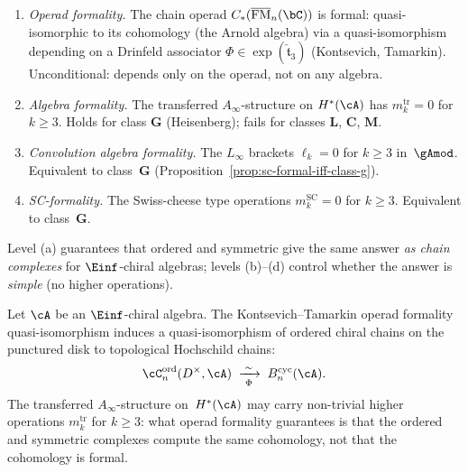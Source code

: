 \begin{definition}
\label{def:e1-formality-hierarchy}
\begin{enumerate}[label=\textup{(\alph*)}]
\item \emph{Operad formality.} The chain operad
 $C_*(\overline{\operatorname{FM}}_n(\bC))$ is formal:
 quasi-isomorphic to its cohomology (the Arnold algebra)
 via a quasi-isomorphism depending on a Drinfeld associator
 $\Phi \in \exp(\hat{\mathfrak{t}}_3)$
 (Kontsevich, Tamarkin). Unconditional: depends only on the
 operad, not on any algebra.
\item \emph{Algebra formality.} The transferred
 $A_\infty$-structure on $H^*(\cA)$ has
 $m_k^{\mathrm{tr}} = 0$ for $k \ge 3$.
 Holds for class $\mathbf{G}$ (Heisenberg); fails for
 classes $\mathbf{L}$, $\mathbf{C}$, $\mathbf{M}$.
\item \emph{Convolution algebra formality.}
 The $L_\infty$ brackets $\ell_k = 0$ for
 $k \ge 3$ in~$\gAmod$. Equivalent to class~$\mathbf{G}$
 (Proposition~\ref{prop:sc-formal-iff-class-g}).
\item \emph{SC-formality.} The Swiss-cheese type
 operations $m_k^{\mathrm{SC}} = 0$ for $k \ge 3$.
 Equivalent to class~$\mathbf{G}$.
\end{enumerate}
Level (a) guarantees that ordered and symmetric give the
same answer \emph{as chain complexes} for $\Einf$-chiral
algebras; levels (b)--(d) control whether the answer is
\emph{simple} (no higher operations).
\end{definition}

\begin{theorem}
\label{thm:e1-formality-bridge}
\ClaimStatusProvedHere
{}
Let $\cA$ be an $\Einf$-chiral algebra. The
Kontsevich--Tamarkin operad formality quasi-isomorphism
induces a quasi-isomorphism of ordered chiral chains on the
punctured disk to topological Hochschild chains:
\begin{equation}\label{eq:e1-formality-bridge}
\cC_n^{\mathrm{ord}}(D^\times, \cA)
\;\xrightarrow[\Phi]{\;\sim\;}\;
B^{\mathrm{cyc}}_n(\cA).
\end{equation}
The transferred $A_\infty$-structure on~$H^*(\cA)$ may
carry non-trivial higher operations $m_k^{\mathrm{tr}}$
for $k \ge 3$: what operad formality guarantees is that
the ordered and symmetric complexes compute the same
cohomology, not that the cohomology is formal.
\end{theorem}

